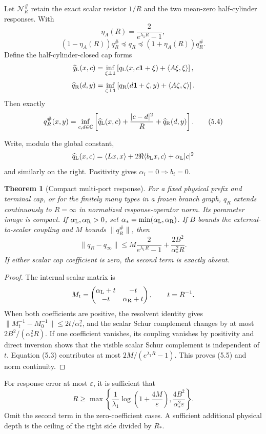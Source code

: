 \documentclass[11pt]{article}
\newtheorem{theorem}{Theorem}[section]
\theoremstyle{definition}
\theoremstyle{remark}
\begin{document}
Let $\mathcal N_R^\#$ retain the exact scalar resistor $1/R$ and the two
mean-zero half-cylinder responses.  With
\[
 \eta_A(R)=\frac{2}{e^{\lambda_1R}-1},
\]
\[
 (1-\eta_A(R))q_R^\#\preceq q_R
 \preceq(1+\eta_A(R))q_R^\#.
 \tag{5.3}
\]
Define the half-cylinder-closed cap forms
\[
 \widehat q_{\rm L}(x,c)=\inf_{\xi\perp\mathbf1}
 \left[q_{\rm L}(x,c\mathbf1+\xi)+\langle A\xi,\xi\rangle\right],
\]
\[
 \widehat q_{\rm R}(d,y)=\inf_{\zeta\perp\mathbf1}
 \left[q_{\rm R}(d\mathbf1+\zeta,y)+\langle A\zeta,\zeta\rangle\right].
\]
Then exactly
\[
 q_R^\#(x,y)=\inf_{c,d\in\mathbb C}
 \left[\widehat q_{\rm L}(x,c)+\frac{|c-d|^2}{R}
 +\widehat q_{\rm R}(d,y)\right].
 \tag{5.4}
\]

Write, modulo the global constant,
\[
 \widehat q_{\rm L}(x,c)=\langle Lx,x\rangle
 +2\Re\langle b_{\rm L}x,c\rangle+\alpha_{\rm L}|c|^2
\]
and similarly on the right.  Positivity gives
$\alpha_i=0\Rightarrow b_i=0$.

\begin{theorem}[Compact multi-port response]
For a fixed physical prefix and terminal cap, or for the finitely many types in a
frozen branch graph, $q_R$ extends continuously to $R=\infty$ in normalized
response-operator norm.  Its parameter image is compact.  If
$\alpha_{\rm L},\alpha_{\rm R}>0$, set
$\alpha_*=\min(\alpha_{\rm L},\alpha_{\rm R})$.  If $B$ bounds the
external-to-scalar coupling and $M$ bounds $\|q_R^\#\|$, then
\[
 \boxed{
 \|q_R-q_\infty\|
 \le M\frac{2}{e^{\lambda_1R}-1}
 +\frac{2B^2}{\alpha_*^2R}.}
 \tag{5.5}
\]
If either scalar cap coefficient is zero, the second term is exactly absent.
\end{theorem}

\begin{proof}
The internal scalar matrix is
\[
 M_t=\begin{pmatrix}\alpha_{\rm L}+t&-t\\-t&\alpha_{\rm R}+t\end{pmatrix},
 \qquad t=R^{-1}.
\]
When both coefficients are positive, the resolvent identity gives
$\|M_t^{-1}-M_0^{-1}\|\le2t/\alpha_*^2$, and the scalar Schur complement changes
by at most $2B^2/(\alpha_*^2R)$.  If one coefficient vanishes, its coupling
vanishes by positivity and direct inversion shows that the visible scalar Schur
complement is independent of $t$.  Equation (5.3) contributes at most
$2M/(e^{\lambda_1R}-1)$.  This proves (5.5) and norm continuity.
\end{proof}

For response error at most $\varepsilon$, it is sufficient that
\[
 \boxed{
 R\ge\max\left\{
 \frac1{\lambda_1}\log\left(1+\frac{4M}{\varepsilon}\right),
 \frac{4B^2}{\alpha_*^2\varepsilon}
 \right\}.}
 \tag{5.6}
\]
Omit the second term in the zero-coefficient cases.  A sufficient additional
physical depth is the ceiling of the right side divided by $R_*$.
\end{document}
